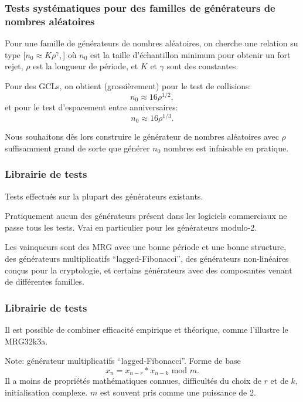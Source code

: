 \documentclass[t,usepdftitle=false]{beamer}
\begin{document}
\begin{frame}
\frametitle{Tests systématiques pour des familles de générateurs de nombres aléatoires}

Pour une famille de générateurs de nombres aléatoires, on cherche une relation su type
$[
  n_0 \approx K \rho^{\gamma},
$]
où $n_0$ est la taille d'échantillon minimum pour obtenir un fort rejet,
$\rho$ est la longueur de période, et $K$ et $\gamma$ sont des constantes.

Pour des GCLs, on obtient (grossièrement) pour le test de collisions:
\[
n_0 \approx 16 \rho^{1/2}, 
\]
et pour le test d'espacement entre anniversaires:
\[
n_0 \approx 16 \rho^{1/3}. 
\]

Nous souhaitons dès lors construire le générateur de nombres aléatoires avec $\rho$ suffisamment grand de sorte que
générer $n_0$ nombres est infaisable en pratique.

\end{frame}

\begin{frame}
\frametitle{Librairie de tests} 

Tests effectués sur la plupart des générateurs existants.

\mbox{}

Pratiquement aucun des générateurs présent dans les logiciels
commerciaux ne passe tous les tests.
Vrai en particulier pour les générateurs modulo-2.

\mbox{}

Les vainqueurs sont des MRG avec une bonne période et une bonne structure,
des générateurs multiplicatifs ``lagged-Fibonacci'', des générateurs
non-linéaires conçus pour la cryptologie, et certains générateurs avec
des composantes venant de différentes familles.

\end{frame}

\begin{frame}
\frametitle{Librairie de tests} 

Il est possible de combiner efficacité empirique et théorique, comme l'illustre le MRG32k3a.

\mbox{}

Note: générateur multiplicatifs ``lagged-Fibonacci''. Forme de base
\[
x_n = x_{n-r}*x_{n-k} \mbox{ mod } m.
\]
Il a moins de propriétés mathématiques connues, difficultés du choix de $r$ et
de $k$, initialisation complexe.
$m$ est souvent pris comme une puissance de 2.

\end{frame}
\end{document}
